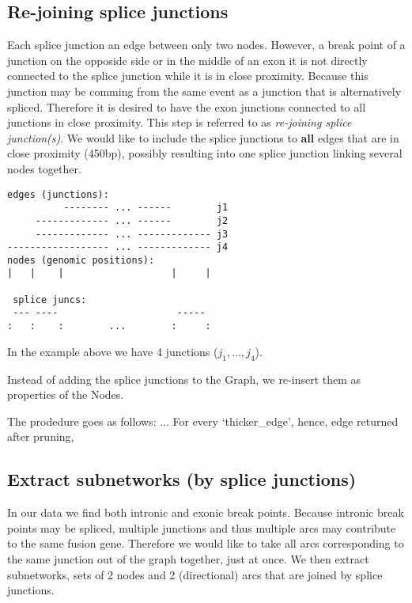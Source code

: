 \documentclass{article}
\theoremstyle{definition}
\begin{document}
\subsection{Re-joining splice junctions}
Each splice junction an edge between only two nodes.
However, a break point of a junction on the opposide side or in the middle of an exon it is not directly connected to the splice junction while it is in close proximity.
Because this junction may be comming from the same event as a junction that is alternatively spliced.
Therefore it is desired to have the exon junctions connected to all junctions in close proximity.
This step is referred to as \textit{re-joining splice junction(s)}.
We would like to include the splice junctions to \textbf{all} edges that are in close proximity (450bp), possibly resulting into one splice junction linking several nodes together.

\begin{verbatim}
edges (junctions):
          -------- ... ------        j1
     ------------- ... ------        j2
     ------------- ... ------------- j3
------------------ ... ------------- j4
nodes (genomic positions):
|   |    |                   |     |

 splice juncs:
 --- ----                     -----
:   :    :        ...        :     :
\end{verbatim}
In the example above we have 4 junctions ($j_1,\ldots,j_4$).

Instead of adding the splice junctions to the Graph, we re-insert them as properties of the Nodes.

The prodedure goes as follows:
...
For every `thicker\_edge', hence, edge returned after pruning, 

\subsection{Extract subnetworks (by splice junctions)}
In our data we find both intronic and exonic break points.
Because intronic break points may be spliced, multiple junctions and thus multiple arcs may contribute to the same fusion gene.
Therefore we would like to take all arcs corresponding to the same junction out of the graph together, just at once.
We then extract subnetworks, sets of 2 nodes and 2 (directional) arcs that are joined by splice junctions.
\end{document}
